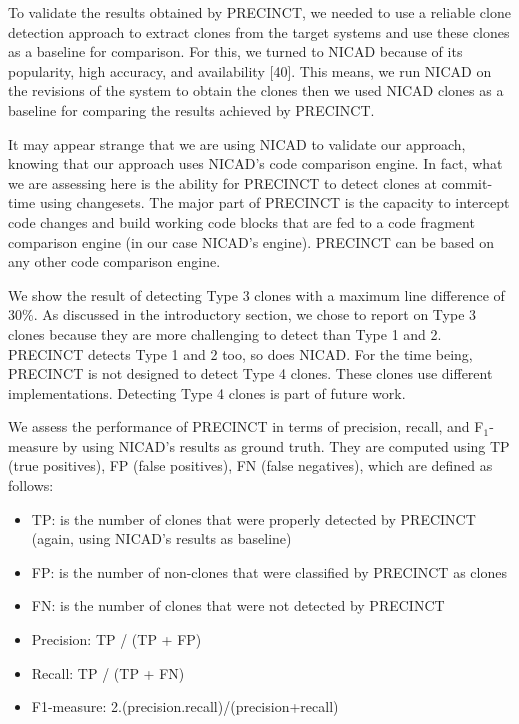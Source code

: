 \documentclass[12pt]{report}
\providecommand{\tightlist}{%
  \setlength{\itemsep}{0pt}\setlength{\parskip}{0pt}}
\begin{document}
To validate the results obtained by PRECINCT, we needed to use a
reliable clone detection approach to extract clones from the target
systems and use these clones as a baseline for comparison. For this, we
turned to NICAD because of its popularity, high accuracy, and
availability {[}40{]}. This means, we run NICAD on the revisions of the
system to obtain the clones then we used NICAD clones as a baseline for
comparing the results achieved by PRECINCT.

It may appear strange that we are using NICAD to validate our approach,
knowing that our approach uses NICAD's code comparison engine. In fact,
what we are assessing here is the ability for PRECINCT to detect clones
at commit-time using changesets. The major part of PRECINCT is the
capacity to intercept code changes and build working code blocks that
are fed to a code fragment comparison engine (in our case NICAD's
engine). PRECINCT can be based on any other code comparison engine.

We show the result of detecting Type 3 clones with a maximum line
difference of 30\%. As discussed in the introductory section, we chose
to report on Type 3 clones because they are more challenging to detect
than Type 1 and 2. PRECINCT detects Type 1 and 2 too, so does NICAD. For
the time being, PRECINCT is not designed to detect Type 4 clones. These
clones use different implementations. Detecting Type 4 clones is part of
future work.

We assess the performance of PRECINCT in terms of precision, recall, and
F\(_{1}\)-measure by using NICAD's results as ground truth. They are
computed using TP (true positives), FP (false positives), FN (false
negatives), which are defined as follows:

\begin{itemize}
\tightlist
\item
  TP: is the number of clones that were properly detected by PRECINCT
  (again, using NICAD's results as baseline)
\item
  FP: is the number of non-clones that were classified by PRECINCT as
  clones
\item
  FN: is the number of clones that were not detected by PRECINCT
\item
  Precision: TP / (TP + FP)
\item
  Recall: TP / (TP + FN)
\item
  F1-measure: 2.(precision.recall)/(precision+recall)
\end{itemize}
\end{document}

